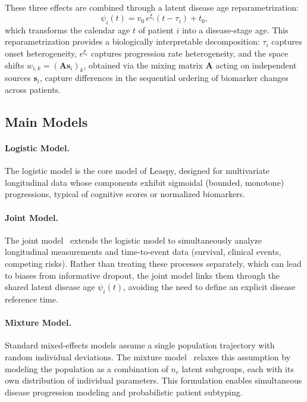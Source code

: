 \documentclass{rapportCS}
\begin{document}
These three effects are combined through a latent disease age reparametrization:
\begin{equation}
  \psi_i(t) = v_0\, e^{\xi_i}(t - \tau_i) + t_0,
\label{eq:latent-age}
\end{equation} 
which transforms the calendar age $t$ of patient $i$ into a disease-stage age. This reparametrization provides a biologically interpretable decomposition: $\tau_i$ captures onset heterogeneity, $e^{\xi_i}$ captures progression rate heterogeneity, and the space shifts $w_{i,k} = (\mathbf{A}\mathbf{s}_i)_k$, obtained via the mixing matrix $\mathbf{A}$ acting on independent sources $\mathbf{s}_i$, capture differences in the sequential ordering of biomarker changes across patients.

\subsection{Main Models}

\paragraph{Logistic Model.} The logistic model is the core model of Leaspy, designed for multivariate longitudinal data whose components exhibit sigmoidal (bounded, monotone) progressions, typical of cognitive scores or normalized biomarkers.

\paragraph{Joint Model.} The joint model~\cite{ortholand2025joint} extends the logistic model to simultaneously analyze longitudinal measurements and time-to-event data (survival, clinical events, competing risks). Rather than treating these processes separately, which can lead to biases from informative dropout, the joint model links them through the shared latent disease age $\psi_i(t)$, avoiding the need to define an explicit disease reference time.

\paragraph{Mixture Model.} Standard mixed-effects models assume a single population trajectory with random individual deviations. The mixture model~\cite{kaisaridi2025mixture} relaxes this assumption by modeling the population as a combination of $n_c$ latent subgroups, each with its own distribution of individual parameters. This formulation enables simultaneous disease progression modeling and probabilistic patient subtyping.
\end{document}
